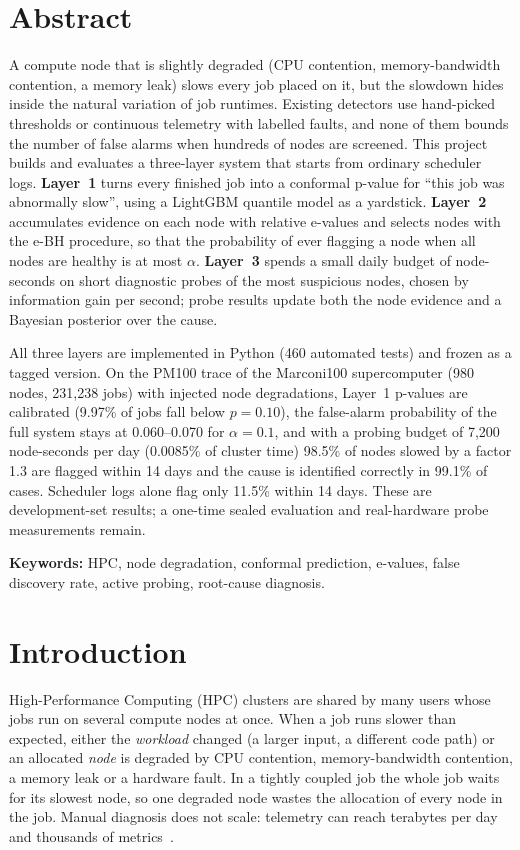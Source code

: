 \documentclass[10pt,a4paper]{article}
\begin{document}
\section*{Abstract}
A compute node that is slightly degraded (CPU contention, memory-bandwidth contention, a memory leak) slows every job placed on it, but the slowdown hides inside the natural variation of job runtimes. Existing detectors use hand-picked thresholds or continuous telemetry with labelled faults, and none of them bounds the number of false alarms when hundreds of nodes are screened. This project builds and evaluates a three-layer system that starts from ordinary scheduler logs. \textbf{Layer~1} turns every finished job into a conformal p-value for ``this job was abnormally slow'', using a LightGBM quantile model as a yardstick. \textbf{Layer~2} accumulates evidence on each node with relative e-values and selects nodes with the e-BH procedure, so that the probability of ever flagging a node when all nodes are healthy is at most $\alpha$. \textbf{Layer~3} spends a small daily budget of node-seconds on short diagnostic probes of the most suspicious nodes, chosen by information gain per second; probe results update both the node evidence and a Bayesian posterior over the cause.

All three layers are implemented in Python (460 automated tests) and frozen as a tagged version. On the PM100 trace of the Marconi100 supercomputer (980 nodes, 231{,}238 jobs) with injected node degradations, Layer~1 p-values are calibrated (9.97\% of jobs fall below $p = 0.10$), the false-alarm probability of the full system stays at 0.060--0.070 for $\alpha = 0.1$, and with a probing budget of 7{,}200 node-seconds per day (0.0085\% of cluster time) 98.5\% of nodes slowed by a factor 1.3 are flagged within 14 days and the cause is identified correctly in 99.1\% of cases. Scheduler logs alone flag only 11.5\% within 14 days. These are development-set results; a one-time sealed evaluation and real-hardware probe measurements remain.

\vspace{4pt}
\textbf{Keywords:} HPC, node degradation, conformal prediction, e-values, false discovery rate, active probing, root-cause diagnosis.

\tableofcontents
\clearpage

\section{Introduction}
High-Performance Computing (HPC) clusters are shared by many users whose jobs run on several compute nodes at once. When a job runs slower than expected, either the \emph{workload} changed (a larger input, a different code path) or an allocated \emph{node} is degraded by CPU contention, memory-bandwidth contention, a memory leak or a hardware fault. In a tightly coupled job the whole job waits for its slowest node, so one degraded node wastes the allocation of every node in the job. Manual diagnosis does not scale: telemetry can reach terabytes per day and thousands of metrics~\cite{aksar}.
\end{document}
